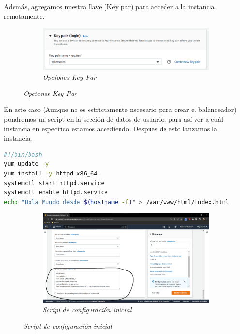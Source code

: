 Además, agregamos nuestra llave (Key par) para acceder a la instancia remotamente.

\begin{figure}[H]
    \centering
    \begin{subfigure}[b]{0.8\textwidth}
        \centering
        \includegraphics[width=\textwidth]{Figures/0. General/load_balancer_2.png}
        \caption{\textit{Opciones Key Par}}
        \label{fig: load balancer 2}
    \end{subfigure}
\end{figure}

En este caso (Aunque no es estrictamente necesario para crear el balanceador)
pondremos un script en la sección de datos de usuario, para así ver a cuál
instancia en específico estamos accediendo. Despues de esto lanzamos la instancia.

\begin{lstlisting}[language=Bash]
#!/bin/bash
yum update -y
yum install -y httpd.x86_64
systemctl start httpd.service
systemctl enable httpd.service
echo "Hola Mundo desde $(hostname -f)" > /var/www/html/index.html
\end{lstlisting}

\begin{figure}[H]
    \centering
    \begin{subfigure}[b]{0.8\textwidth}
        \centering
        \includegraphics[width=\textwidth]{Figures/0. General/load_balancer_3.png}
        \caption{\textit{Script de configuración inicial}}
        \label{fig: load balancer 3}
    \end{subfigure}
\end{figure}

